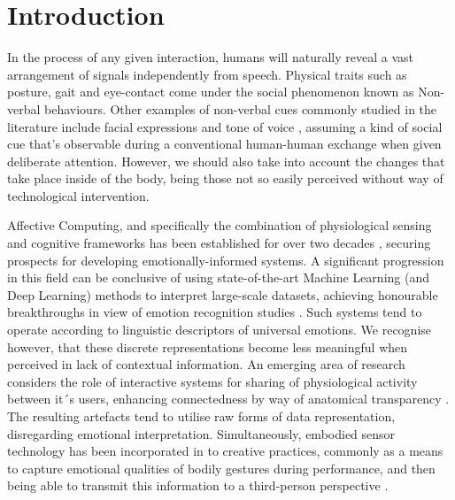 

\chapter{Introduction}
\label{sec:objectives}

In the process of any given interaction, humans will naturally reveal a vast arrangement of signals independently from speech. Physical traits such as posture, gait and eye-contact come under the social phenomenon known as Non-verbal behaviours. Other examples of non-verbal cues commonly studied in the literature include facial expressions and tone of voice \cite{carton_nonverbal_1999}, assuming a kind of social cue that's observable during a conventional human-human exchange when given deliberate attention. However, we should also take into account the changes that take place inside of the body, being those not so easily perceived without way of technological intervention.

Affective Computing, and specifically the combination of physiological sensing and cognitive frameworks has been established for over two decades \cite{picard_affective_2000}, securing prospects for developing emotionally-informed systems. A significant progression in this field can be conclusive of using state-of-the-art Machine Learning (and Deep Learning) methods to interpret large-scale datasets, achieving honourable breakthroughs in view of emotion recognition studies \cite{bota_review_2019}. Such systems tend to operate according to linguistic descriptors of universal emotions. We recognise however, that these discrete representations become less meaningful when perceived in lack of contextual information. An emerging area of research considers the role of interactive systems for sharing of physiological activity between it´s users, enhancing connectedness by way of anatomical transparency \cite{lux_live_2018}. The resulting artefacts tend to utilise raw forms of data representation, disregarding emotional interpretation. Simultaneously, embodied sensor technology has been incorporated in to creative practices, commonly as a means to capture emotional qualities of bodily gestures during performance, and then being able to transmit this information to a third-person perspective \cite{fdili_alaoui_seeing_2017}. 

